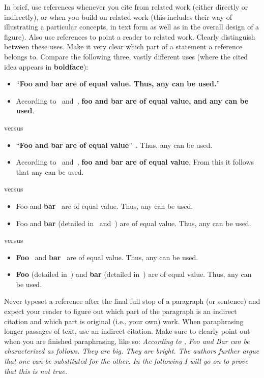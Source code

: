 \documentclass[]{nsm-thesis}
\begin{document}
In brief, use references whenever you cite from related work (either directly or indirectly), or when you build on related work (this includes their way of illustrating a particular concepts, in text form as well as in the overall design of a figure).
Also use references to point a reader to related work.
Clearly distinguish between these uses.
Make it very clear which part of a statement a reference belongs to.
Compare the following three, vastly different uses (where the cited idea appears in \textbf{boldface}):

\begin{itemize}
\item \enquote{\textbf{Foo and bar are of equal value. Thus, any can be used.}}~\cite{knuth1984complexity,berry2011apparent}
\item According to~\cite{knuth1984complexity} and~\cite{berry2011apparent}, \textbf{foo and bar are of equal value, and any can be used}.
\end{itemize}
versus
\begin{itemize}
\item \enquote{\textbf{Foo and bar are of equal value}}~\cite{knuth1984complexity,berry2011apparent}. Thus, any can be used.
\item According to~\cite{knuth1984complexity} and~\cite{berry2011apparent}, \textbf{foo and bar are of equal value}. From this it follows that any can be used.
\end{itemize}
versus
\begin{itemize}
\item Foo and \textbf{bar}~\cite{knuth1984complexity,berry2011apparent} are of equal value. Thus, any can be used.
\item Foo and \textbf{bar} (detailed in~\cite{knuth1984complexity} and~\cite{berry2011apparent}) are of equal value. Thus, any can be used.
\end{itemize}
versus
\begin{itemize}
\item \textbf{Foo}~\cite{knuth1984complexity} and \textbf{bar}~\cite{berry2011apparent} are of equal value. Thus, any can be used.
\item \textbf{Foo} (detailed in~\cite{knuth1984complexity}) and \textbf{bar} (detailed in~\cite{berry2011apparent}) are of equal value. Thus, any can be used.
\end{itemize}

Never typeset a reference after the final full stop of a paragraph (or sentence) and expect your reader to figure out which part of the paragraph is an indirect citation and which part is original (i.e., your own) work.
When paraphrasing longer passages of text, use an indirect citation.
Make sure to clearly point out when you are finished paraphrasing, like so:
\emph{According to \textcite{knuth1984complexity}, Foo and Bar can be characterized as follows. They are big. They are bright. The authors further argue that one can be substituted for the other. In the following I will go on to prove that this is not true.}
\end{document}
